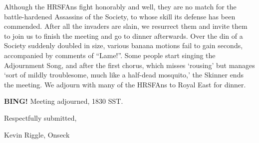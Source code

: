\documentclass[10pt]{article}
\newcommand{\bing}{{\bf BING!} }
\begin{document}
Although the HRSFAns fight honorably and well, they are no match for the battle-hardened Assassins 
of the Society, to whose skill its defense has been commended.
After all the invaders are slain, we resurrect them and invite them to join us
to finish the meeting and go to dinner afterwards.
Over the din of a Society suddenly doubled in size, various banana motions fail 
to gain seconds, accompanied by comments of ``Lame!''.  Some people start 
singing the Adjournment Song, and after the first chorus, which misses
`rousing' but manages `sort of mildly troublesome, much like a half-dead 
mosquito,' the Skinner ends the meeting.  We adjourn with many of the HRSFAns to 
Royal East for dinner.

\bing
\noindent
Meeting adjourned, 1830 SST.

\vspace{18pt}

\centerline{Respectfully submitted,}
\centerline{Kevin Riggle, Onseck}
\end{document}
